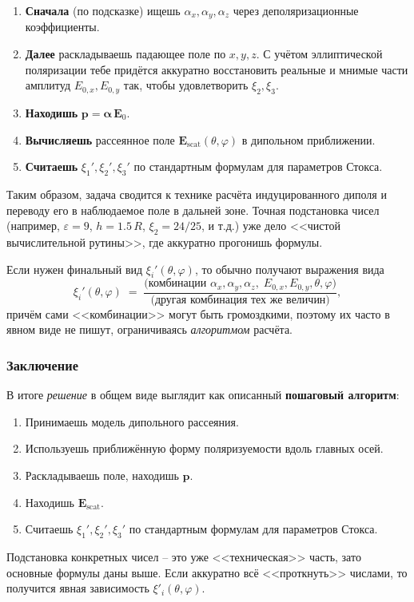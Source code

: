 \documentclass{article}
\begin{document}
\begin{enumerate}
  \item \textbf{Сначала} (по подсказке) ищешь $\alpha_x, \alpha_y, \alpha_z$ через деполяризационные коэффициенты.
  \item \textbf{Далее} раскладываешь падающее поле по $x,y,z$. С учётом эллиптической поляризации тебе придётся аккуратно восстановить реальные и мнимые части амплитуд $E_{0,x}, E_{0,y}$ так, чтобы удовлетворить $\xi_2, \xi_3$.
  \item \textbf{Находишь} $\mathbf{p} = \boldsymbol{\alpha}\,\mathbf{E}_0$.
  \item \textbf{Вычисляешь} рассеянное поле $\mathbf{E}_\text{scat}(\theta,\varphi)$ в дипольном приближении.
  \item \textbf{Считаешь} $\xi_1', \xi_2', \xi_3'$ по стандартным формулам для параметров Стокса.
\end{enumerate}

Таким образом, задача сводится к технике расчёта индуцированного диполя и переводу его в наблюдаемое поле в дальней зоне. Точная подстановка чисел (например, $\varepsilon=9$, $h=1.5\,R$, $\xi_2=24/25$, и т.д.) уже дело <<чистой вычислительной рутины>>, где аккуратно прогонишь формулы.

Если нужен финальный вид $\xi_i'(\theta,\varphi)$, то обычно получают выражения вида
\[
  \xi_i'(\theta,\varphi) \;=\;
  \frac{\text{(комбинации } \alpha_x,\alpha_y,\alpha_z,\; E_{0,x},E_{0,y}, \theta,\varphi)}{\text{(другая комбинация тех же величин)}},
\]
причём сами <<комбинации>> могут быть громоздкими, поэтому их часто в явном виде не пишут, ограничиваясь \emph{алгоритмом} расчёта.

\subsubsection*{Заключение}

В итоге \emph{решение} в общем виде выглядит как описанный \textbf{пошаговый алгоритм}:
\begin{enumerate}
  \item Принимаешь модель дипольного рассеяния.
  \item Используешь приближённую форму поляризуемости вдоль главных осей.
  \item Раскладываешь поле, находишь $\mathbf{p}$.
  \item Находишь $\mathbf{E}_\text{scat}$.
  \item Считаешь $\xi_1', \xi_2', \xi_3'$ по стандартным формулам для параметров Стокса.
\end{enumerate}

Подстановка конкретных чисел – это уже <<техническая>> часть, зато основные формулы даны выше. Если аккуратно всё <<проткнуть>> числами, то получится явная зависимость $\xi'_i(\theta,\varphi)$.
\end{document}
